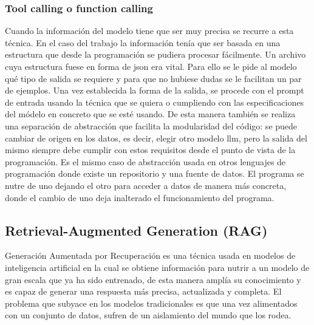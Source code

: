 \subsubsection{Tool calling o function calling}
Cuando la información del modelo tiene que ser muy precisa se recurre a esta técnica. En el caso del trabajo la información tenía que ser basada en una estructura que desde la programación se pudiera procesar fácilmente. Un archivo cuya estructura fuese en forma de json era vital. Para ello se le pide al modelo qué tipo de salida se requiere y para que no hubiese dudas se le facilitan un par de ejemplos. Una vez establecida la forma de la salida, se procede con el prompt de entrada usando la técnica que se quiera o cumpliendo con las especificaciones del módelo en concreto que se esté usando.
De esta manera también se realiza una separación de abstracción que facilita la modularidad del código: se puede cambiar de origen en los datos, es decir, elegir otro modelo \acrshort{llm}, pero la salida del mismo siempre debe cumplir con estos requisitos desde el punto de vista de la programación. Es el mismo caso de abstracción usada en otros lenguajes de programación donde existe un repositorio y una fuente de datos. El programa se nutre de uno dejando el otro para acceder a datos de manera más concreta, donde el cambio de uno deja inalterado el funcionamiento del programa.

\subsection{Retrieval-Augmented Generation (RAG)}
Generación Aumentada por Recuperación es una técnica usada en modelos de inteligencia artificial en la cual se obtiene información para nutrir a un modelo de gran escala que ya ha sido entrenado, de esta manera amplía su conocimiento y es capaz de generar una respuesta más precisa, actualizada y completa. 
El problema que subyace en los modelos tradicionales es que una vez alimentados con un conjunto de datos, sufren de un aislamiento del mundo que los rodea.


